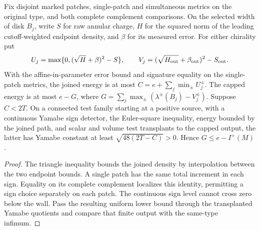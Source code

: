 \begin{proposition}
\label{prop:ed03-signed-repair}
\leanok
Fix disjoint marked patches, single-patch and simultaneous metrics on the
original type, and both complete complement comparisons. On the selected
width of disk $B_j$, write $S$ for raw annular charge, $H$ for the squared
norm of the leading cutoff-weighted endpoint density, and $\beta$ for
its measured error. For either chirality put
\[
 U_j=\max\{0,(\sqrt H+\beta)^2-S\},\qquad
 V_j=(\sqrt{H_{\rm out}}+\beta_{\rm out})^2-S_{\rm out}.
\]
With the affine-in-parameter error bound and signature equality on the
single-patch metrics, the joined energy is at most
$C=e+\sum_j\min_{\pm}U_j^{\pm}$. The capped energy is at most $e-G$,
where $G=\sum_j\max_{\pm}(\lambda^{\pm}(B_j)-V_j^{\pm})$.
Suppose $C<2T$. On a connected test family starting at a positive
source, with a continuous Yamabe sign detector, the Euler-square
inequality, energy bounded by the joined path, and scalar and volume
test transplants to the capped output, the latter has Yamabe constant
at least $\sqrt{48(2T-C)}>0$. Hence $G\le e-I^+(M)$.
\end{proposition}
\begin{proof}
\leanok
The triangle inequality bounds the joined density by interpolation
between the two endpoint bounds. A single patch has the same total
increment in each sign. Equality on its complete complement localizes
this identity, permitting a sign choice separately on each patch.
The continuous sign level cannot cross zero below the wall. Pass
the resulting uniform lower bound through the transplanted Yamabe
quotients and compare that finite output with the same-type infimum.
\end{proof}

